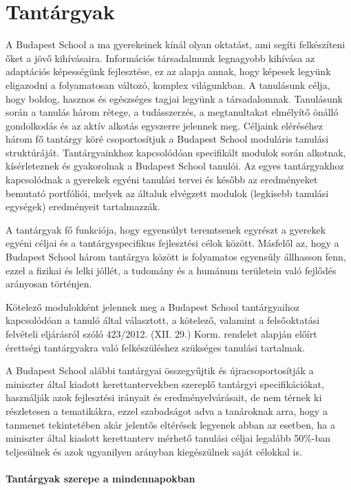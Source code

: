 \section{Tantárgyak}
\label{sec:tantargyak}
A Budapest School a ma gyerekeinek kínál olyan oktatást, ami segíti
felkészíteni őket a jövő kihívásaira. Információs társadalmunk legnagyobb
kihívása az adaptációs képességünk fejlesztése, ez az alapja annak, hogy
képesek legyünk eligazodni a folyamatosan változó, komplex világunkban. A
tanulásunk célja, hogy boldog, hasznos és egészséges tagjai legyünk a
társadalomnak. Tanulásunk során a tanulás három rétege, a tudásszerzés, a
megtanultakat elmélyítő önálló gondolkodás és az aktív alkotás egyszerre
jelennek meg. Céljaink eléréséhez három fő tantárgy köré csoportosítjuk a
Budapest School moduláris tanulási struktúráját. Tantárgyainkhoz kapcsolódóan
specifikált modulok során alkotnak, kísérleteznek és gyakorolnak a Budapest
School tanulói. Az egyes tantárgyakhoz kapcsolódnak a gyerekek egyéni tanulási
tervei és később az eredményeket bemutató portfóliói, melyek az általuk
elvégzett modulok (legkisebb tanulási egységek) eredményeit tartalmazzák.

A tantárgyak fő funkciója, hogy egyensúlyt teremtsenek egyrészt a gyerekek
egyéni céljai és a tantárgyspecifikus fejlesztési célok között. Másfelől az,
hogy a Budapest School három tantárgya között is folyamatos egyensúly állhasson
fenn, ezzel a fizikai és lelki jóllét, a tudomány és a humánum területein való
fejlődés arányosan történjen.

Kötelező modulokként jelennek meg a Budapest School tantárgyaihoz kapcsolódóan
a tanuló által választott, a kötelező, valamint a felsőoktatási felvételi
eljárásról szóló 423/2012. (XII. 29.) Korm. rendelet alapján előírt érettségi
tantárgyakra való felkészüléshez szükséges tanulási tartalmak.

A Budapest School alábbi tantárgyai összegyűjtik és újracsoportosítják a
miniszter által kiadott kerettantervekben szereplő tantárgyi specifikációkat,
használják azok fejlesztési irányait és eredményelvárásait, de nem térnek ki
részletesen a tematikákra, ezzel szabadságot adva a tanároknak arra, hogy a
tanmenet tekintetében akár jelentős eltérések legyenek abban az esetben, ha a
miniszter által kiadott kerettanterv mérhető tanulási céljai legalább 50\%-ban
teljesülnek és azok ugyanilyen arányban kiegészülnek saját célokkal is.

\paragraph{Tantárgyak szerepe a mindennapokban}

